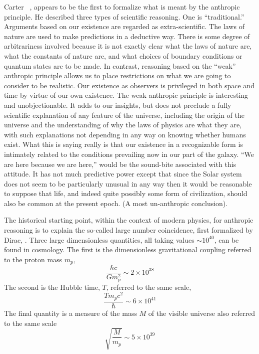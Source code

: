 \documentclass{article}
\begin{document}
Carter~ \cite{BC:anth1}, appears to be the first to formalize what is meant
by the anthropic principle. He described three types of scientific
reasoning. One is ``traditional.'' Arguments based on our existence are
regarded as extra-scientific. The laws of nature are used to make
predictions in a deductive way. There is some degree of arbitrariness
involved because it is not exactly clear what the laws of nature are,
what the constants of nature are, and what choices of boundary conditions
or quantum states are to be made. In contrast, reasoning based on the
``weak'' anthropic principle allows us to place restrictions on what
we are going to consider to be realistic. Our existence as observers is
privileged in both space and time by virtue of our own existence.
The weak anthropic principle is interesting and unobjectionable. It adds
to our insights, but does not preclude a fully scientific explanation
of any feature of the universe, including the origin of the universe
and the understanding of why the laws of physics are what they are,
with such explanations not depending in any way on knowing whether
humans exist.
What this is saying really is that our existence in a recognizable form
is intimately related to the conditions prevailing now in our part of
the galaxy. ``We are here because we are here,'' would be the sound-bite
associated with this attitude. It has not much predictive power
except that since the Solar system does not seem to be particularly
unusual in any way then it would be reasonable to suppose that life,
and indeed quite possibly some form of civilization,
should also be common at  the
present epoch. (A most un-anthropic conclusion).

The historical starting point, within the context of modern physics,
for anthropic reasoning is to explain  the so-called
large number coincidence, first formalized by Dirac, \cite{D:ln}.
Three large dimensionless quantities, all taking values $\sim 10^{40}$, can
be
found in cosmology. The first is the dimensionless gravitational coupling
referred to the proton mass $m_p,$
\begin{equation}
\frac{\hbar c}{Gm_p^2} \sim 2 \times 10^{38}
\end{equation}
The second is the Hubble time, $T$, referred to the same scale,
 \begin{equation}
\frac{T m_p c^2}{\hbar} \sim 6 \times 10^{41}
\end{equation}
The final quantity is a measure of the mass $M$ of the visible universe
also referred to the same scale
\begin{equation}
\sqrt{\frac{M}{ m_p}} \sim 5 \times 10^{39}
\end{equation}
\end{document}
